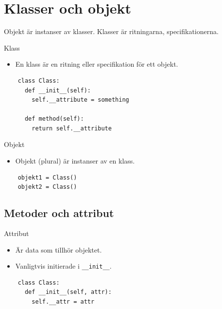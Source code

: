 \mode*

\section{Klasser och objekt}

Objekt är instanser av klasser.
Klasser är ritningarna, specifikationerna.

\begin{frame}[fragile]
  \begin{block}{Klass}
    \begin{itemize}
      \item En klass är en ritning eller specifikation för ett objekt.
    \end{itemize}
  \end{block}

  \begin{verbatim}
    class Class:
      def __init__(self):
        self.__attribute = something

      def method(self):
        return self.__attribute
  \end{verbatim}
\end{frame}

\begin{frame}[fragile]
  \begin{block}{Objekt}
    \begin{itemize}
      \item Objekt (plural) är instanser av en klass.
    \end{itemize}
  \end{block}

  \begin{verbatim}
    objekt1 = Class()
    objekt2 = Class()
  \end{verbatim}
\end{frame}


\subsection{Metoder och attribut}

\begin{frame}[fragile]
  \begin{block}{Attribut}
    \begin{itemize}
      \item Är data som tillhör objektet.
      \item Vanligtvis initierade i \texttt{__init__}.
    \end{itemize}
  \end{block}

  \begin{verbatim}
    class Class:
      def __init__(self, attr):
        self.__attr = attr
  \end{verbatim}
\end{frame}

